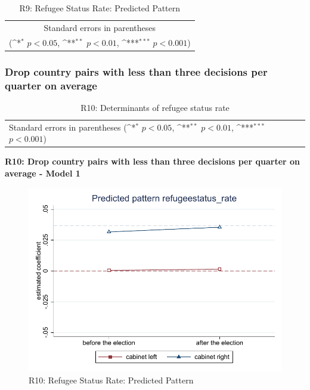 \documentclass[10pt,a4paper]{scrartcl}
\begin{document}
\begin{table}[!ht]\centering
	\footnotesize
	\renewcommand{\arraystretch}{1.2}
	\def\sym#1{\ifmmode^{#1}\else\(^{#1}\)\fi}
	\caption{R9: Refugee Status Rate: Predicted Pattern}
	\begin{tabular}{l*{2}{c}}
		\hline\hline
		
		\hline\hline
		\multicolumn{3}{c}{\footnotesize Standard errors in parentheses} \\
		\multicolumn{3}{c}{\footnotesize (\sym{*} \(p<0.05\), \sym{**} \(p<0.01\), \sym{***} \(p<0.001\))} \\
	\end{tabular}
\end{table}





\clearpage
\FloatBarrier
\subsubsection{Drop country pairs with less than three decisions per quarter on average}
\begin{table}[!ht]\centering
	\renewcommand{\arraystretch}{1.25}
	\small
	\def\sym#1{\ifmmode^{#1}\else\(^{#1}\)\fi}
	\caption{R10: Determinants of refugee status rate}
	\begin{tabular}{l*{3}{c}}
		\hline\hline
		
		\hline\hline
		\multicolumn{4}{l}{\footnotesize Standard errors in parentheses (\sym{*} \(p<0.05\), \sym{**} \(p<0.01\), \sym{***} \(p<0.001\))}\\
	\end{tabular}
\end{table}

\clearpage
\textbf{R10: Drop country pairs with less than three decisions per quarter on average - Model 1}
\begin{figure}[!ht]
	\centering
	\includegraphics[width=1\textwidth]{figures_edited/refugeestatus_rate_graph1_R10.pdf}
	\caption{R10: Refugee Status Rate: Predicted Pattern}
\end{figure}
\end{document}
